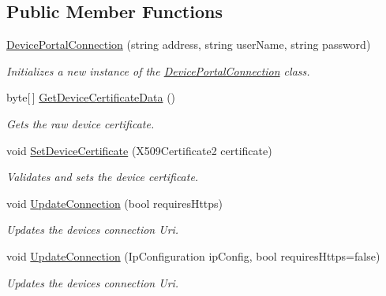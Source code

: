 \subsection*{Public Member Functions}
\begin{DoxyCompactItemize}
\item 
\hyperlink{class_test_app_h_l_1_1_device_portal_connection_abd57138aa1f9085834c194a969505c72}{Device\+Portal\+Connection} (string address, string user\+Name, string password)
\begin{DoxyCompactList}\small\item\em Initializes a new instance of the \hyperlink{class_test_app_h_l_1_1_device_portal_connection}{Device\+Portal\+Connection} class. \end{DoxyCompactList}\item 
byte\mbox{[}$\,$\mbox{]} \hyperlink{class_test_app_h_l_1_1_device_portal_connection_a0a72e826f532c781634bed770dd38fa3}{Get\+Device\+Certificate\+Data} ()
\begin{DoxyCompactList}\small\item\em Gets the raw device certificate. \end{DoxyCompactList}\item 
void \hyperlink{class_test_app_h_l_1_1_device_portal_connection_af93dbc2faf49a953494b3112f31c5833}{Set\+Device\+Certificate} (X509\+Certificate2 certificate)
\begin{DoxyCompactList}\small\item\em Validates and sets the device certificate. \end{DoxyCompactList}\item 
void \hyperlink{class_test_app_h_l_1_1_device_portal_connection_a361d4a40ad667c4818f25e8619d514b8}{Update\+Connection} (bool requires\+Https)
\begin{DoxyCompactList}\small\item\em Updates the device\textquotesingle{}s connection Uri. \end{DoxyCompactList}\item 
void \hyperlink{class_test_app_h_l_1_1_device_portal_connection_af47760d39f76cfb34165e4aeada32ba6}{Update\+Connection} (Ip\+Configuration ip\+Config, bool requires\+Https=false)
\begin{DoxyCompactList}\small\item\em Updates the device\textquotesingle{}s connection Uri. \end{DoxyCompactList}\end{DoxyCompactItemize}
